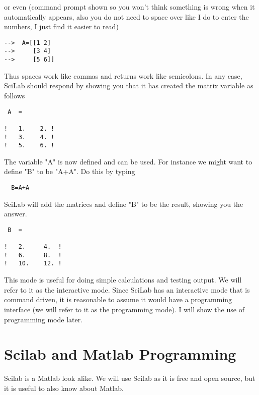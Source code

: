 or even (command prompt shown so you won't think something is wrong when it automatically appears, also you do not need to space over like I do to enter the numbers, I just find it easier to read)
\begin{verbatim}
-->  A=[[1 2]
-->     [3 4]
-->     [5 6]]
\end{verbatim}
Thus spaces work like commas and returns work like semicolons.  In any case, SciLab should respond by showing you that it has created the matrix variable as follows
\begin{verbatim}
 A  =

!   1.    2. !
!   3.    4. !
!   5.    6. !
\end{verbatim}
The variable "A" is now defined and can be used.  For instance we might want to define "B" to be "A+A".  Do this by typing
\begin{verbatim}
  B=A+A
\end{verbatim}
SciLab will add the matrices and define "B" to be the result, showing you the answer.
\begin{verbatim}
 B  =

!   2.     4.  !
!   6.     8.  !
!   10.    12. !
\end{verbatim}
This mode is useful for doing simple calculations and testing output.  We will refer to it as the interactive mode.  Since SciLab has an interactive mode that is command driven, it is reasonable to assume it would have a programming interface (we will refer to it as the programming mode).  I will show the use of programming mode later.

\section{Scilab and Matlab Programming}

Scilab is a Matlab look alike.  We will use Scilab as it is free and open source, but it is useful to also know about Matlab.

